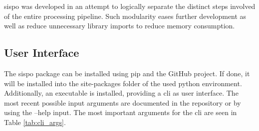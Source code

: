 \gls{sispo} was developed in an attempt to logically separate the distinct steps involved of the entire processing pipeline. Such modularity eases further development as well as reduce unnecessary library imports to reduce memory consumption.

\subsection{User Interface}
The sispo package can be installed using pip and the GitHub project. If done, it will be installed into the site-packages folder of the used python environment. Additionally, an executable is installed, providing a \gls{cli} as user interface. The most recent possible input arguments are documented in the repository or by using the --help input. The most important arguments for the \gls{cli} are seen in Table \ref{tab:cli_args}.

